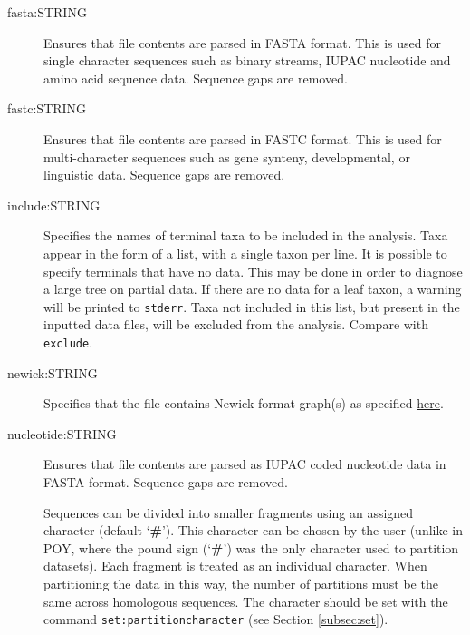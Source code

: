 \begin{description}
		\item [fasta:STRING] Ensures that file contents are parsed in FASTA \citep{PearsonandLipman1988}
		format. This is used for single character sequences such as binary streams, IUPAC 
		nucleotide and amino acid sequence data.   Sequence gaps are removed.
			
		\item [fastc:STRING] Ensures that file contents are parsed in FASTC \citep{WheelerandWashburn2019}
		format. This is used for multi-character sequences such as gene synteny, developmental, 
		or linguistic data.   Sequence gaps are removed.
			
			
		\item [include:STRING] Specifies the names of terminal taxa to be included in the analysis. 
		Taxa appear in the form of a list, with a single taxon per line. It is possible to specify 
		terminals that have no data. This may be done in order to diagnose a large tree on 
		partial data. If there are no data for a leaf taxon, a warning will be printed to \texttt{stderr}. 
		Taxa not included in this list, but present in the inputted data files, will be excluded from 
		the analysis. Compare with \texttt{exclude}.
			
		\item [newick:STRING] Specifies that the file contains Newick format graph(s) as specified 
		\href{https://evolution.genetics.washington.edu/phylip/newick_doc.html}{here}.
			
		\item [nucleotide:STRING] Ensures that file contents are parsed as IUPAC coded nucleotide data 
		in FASTA \citep{PearsonandLipman1988} format.   Sequence gaps are removed.
		
		\begin{tcolorbox}[enhanced,fit to height=3.5cm,
  		colback=JungleGreen!40!black!2!white,colframe=JungleGreen!70!black,title=Note,
  		drop fuzzy shadow]
  		Sequences can be divided into smaller fragments using an assigned character (default `\textbf{\#}'). This 
		character can be chosen by the user (unlike in POY, where the pound sign (`\textbf{\#}') was 
		the only character used to partition datasets). Each fragment is treated as an individual character. When 
		partitioning the data in this way, the number of partitions must be the same across 
		homologous sequences. The character should be set with the command 
		\texttt{set:partitioncharacter} (see Section \ref{subsec:set}).
		\end{tcolorbox}
			

\end{description}
